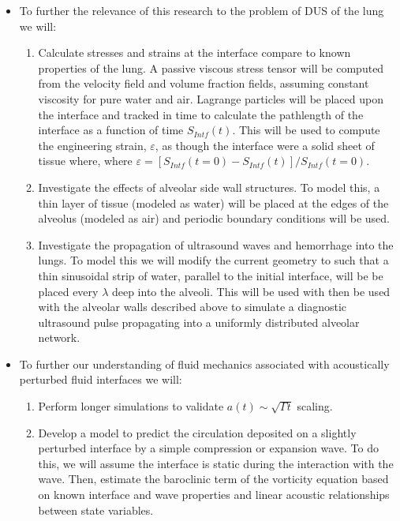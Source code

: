 \begin{itemize}
\item To further the relevance of this research to the problem of
  \ac{DUS} of the lung we will:
  \begin{enumerate}
  \item Calculate stresses and strains at the interface compare to
    known properties of the lung. A passive viscous stress tensor will
    be computed from the velocity field and volume fraction fields,
    assuming constant viscosity for pure water and air. Lagrange
    particles will be placed upon the interface and tracked in time to
    calculate the pathlength of the interface as a function of time
    $S_{Intf}(t)$. This will be used to compute the engineering strain,
    $\varepsilon$, as though the interface were a solid sheet of
    tissue where, where
    $\varepsilon=[S_{Intf}(t=0)-S_{Intf}(t)]/S_{Intf}(t=0)$.
  \item Investigate the effects of alveolar side wall structures. To
    model this, a thin layer of tissue (modeled as water) will be
    placed at the edges of the alveolus (modeled as air) and periodic
    boundary conditions will be used.
  \item Investigate the propagation of ultrasound waves and hemorrhage
    into the lungs. To model this we will modify the current geometry
    to such that a thin sinusoidal strip of water, parallel to the
    initial interface, will be be placed every $\lambda$ deep into the
    alveoli. This will be used with then be used with the alveolar
    walls described above to simulate a diagnostic ultrasound pulse
    propagating into a uniformly distributed alveolar network.
  \end{enumerate}
\item To further our understanding of fluid mechanics
  associated with acoustically perturbed fluid interfaces we will:
  \begin{enumerate}
  \item Perform longer simulations to validate $a(t)\sim\sqrt{\Gamma t}$ scaling.
  \item Develop a model to predict the circulation deposited on a
    slightly perturbed interface by a simple compression or expansion
    wave. To do this, we will assume the interface is static during
    the interaction with the wave. Then, estimate the baroclinic term
    of the vorticity equation based on known interface and wave
    properties and linear acoustic relationships between state
    variables.

\end{enumerate}
\end{itemize}
